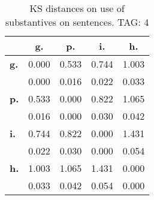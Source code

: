 \begin{table}[h!]
\begin{center}
\begin{tabular}{| l || c | c | c | c |}\hline
 & {\bf g.} & {\bf p.} & {\bf i.} & {\bf h.} \\\hline\hline
{\bf g.} & 0.000 & 0.533 & 0.744 & 1.003 \\
{\bf } & 0.000 & 0.016 & 0.022 & 0.033 \\\hline
{\bf p.} & 0.533 & 0.000 & 0.822 & 1.065 \\
{\bf } & 0.016 & 0.000 & 0.030 & 0.042 \\\hline
{\bf i.} & 0.744 & 0.822 & 0.000 & 1.431 \\
{\bf } & 0.022 & 0.030 & 0.000 & 0.054 \\\hline
{\bf h.} & 1.003 & 1.065 & 1.431 & 0.000 \\
{\bf } & 0.033 & 0.042 & 0.054 & 0.000 \\\hline
\end{tabular}
\caption{KS distances on use of substantives on sentences. TAG: 4}
\end{center}
\end{table}
